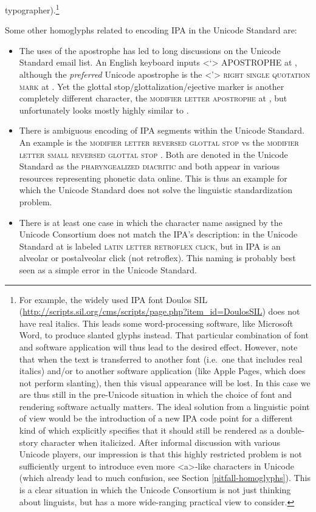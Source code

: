 typographer).\footnote{For example, the widely used IPA font Doulos SIL
(\url{http://scripts.sil.org/cms/scripts/page.php?item\_id=DoulosSIL}) does not
have real italics. This leads some word-processing software, like Microsoft
Word, to produce slanted glyphs instead. That particular combination of font and
software application will thus lead to the desired effect. However, note that
when the text is transferred to another font (i.e.~one that includes real
italics) and/or to another software application (like Apple Pages, which does
not perform slanting), then this visual appearance will be lost. In this case we
are thus still in the pre-Unicode situation in which the choice of font and
rendering software actually matters. The ideal solution from a linguistic point
of view would be the introduction of a new IPA code point for a different kind
of which explicitly specifies that it should still be rendered as a double-story
character when italicized. After informal discussion with various Unicode
players, our impression is that this highly restricted problem is not
sufficiently urgent to introduce even more <a>-like characters in Unicode (which
already lead to much confusion, see Section \ref{pitfall-homoglyphs}). This is a
clear situation in which the Unicode Consortium is not just thinking about
linguists, but has a more wide-ranging practical view to consider.}

Some other homoglyphs related to encoding IPA in the Unicode Standard are:
\begin{itemize}
	\item The uses of the apostrophe has led to long discussions on the Unicode
       Standard email list. An English keyboard inputs
       \textless{}`\textgreater{} APOSTROPHE at , although the
       \textit{preferred} Unicode apostrophe is the \textless{}'\textgreater{}
       \textsc{right single quotation mark} at . Yet the glottal
       stop/glottalization/ejective marker is another completely different
       character, the \textsc{modifier letter apostrophe} at , but
       unfortunately looks mostly highly similar to . 
	\item There is ambiguous encoding of IPA segments within the Unicode Standard.
       An example is the  \textsc{modifier letter reversed glottal
       stop} vs the  \textsc{modifier letter small reversed glottal
       stop} . Both are denoted in the Unicode Standard as the
       \textsc{pharyngealized diacritic} and both appear in various resources
       representing phonetic data online. This is thus an example for which the
       Unicode Standard does not solve the linguistic standardization problem. 
	\item There is at least one case in which the character name assigned by the
       Unicode Consortium does not match the IPA's description: in the Unicode
       Standard at  is labeled \textsc{latin letter retroflex click},
       but in IPA is an alveolar or postalveolar click (not retroflex). This
       naming is probably best seen as a simple error in the Unicode Standard.
\end{itemize}       

